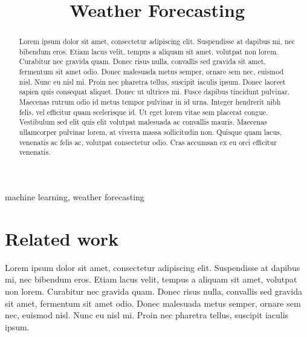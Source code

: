 



\title{Weather Forecasting}
\author{
    \and
    \and
    \and
}

\maketitle

\begin{abstract}
    Lorem ipsum dolor sit amet, consectetur adipiscing elit. Suspendisse at dapibus mi, nec bibendum eros. Etiam lacus velit, tempus a aliquam sit amet, volutpat non lorem. Curabitur nec gravida quam. Donec risus nulla, convallis sed gravida sit amet, fermentum sit amet odio. Donec malesuada metus semper, ornare sem nec, euismod nisl. Nunc eu nisl mi. Proin nec pharetra tellus, suscipit iaculis ipsum.
    Donec laoreet sapien quis consequat aliquet. Donec ut ultrices mi. Fusce dapibus tincidunt pulvinar. Maecenas rutrum odio id metus tempor pulvinar in id urna. Integer hendrerit nibh felis, vel efficitur quam scelerisque id. Ut eget lorem vitae sem placerat congue. Vestibulum sed elit quis elit volutpat malesuada ac convallis mauris. Maecenas ullamcorper pulvinar lorem, at viverra massa sollicitudin non. Quisque quam lacus, venenatis ac felis ac, volutpat consectetur odio. Cras accumsan ex eu orci efficitur venenatis.
\end{abstract}

\begin{IEEEkeywords}
machine learning, weather forecasting
\end{IEEEkeywords}




\section{Related work}

Lorem ipsum dolor sit amet, consectetur adipiscing elit. Suspendisse at dapibus mi, nec bibendum eros. Etiam lacus velit, tempus a aliquam sit amet, volutpat non lorem. Curabitur nec gravida quam. Donec risus nulla, convallis sed gravida sit amet, fermentum sit amet odio. Donec malesuada metus semper, ornare sem nec, euismod nisl. Nunc eu nisl mi. Proin nec pharetra tellus, suscipit iaculis ipsum.

